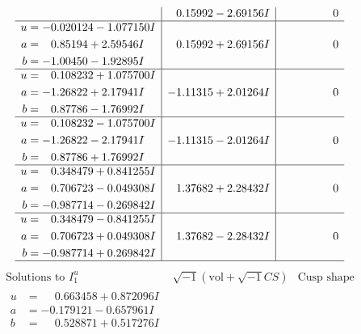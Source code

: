 \documentclass[1p]{elsarticle_modified}
\theoremstyle{definition}
\newcommand{\I}{\sqrt{-1}}
\begin{document}
$$\begin{array}{c|c|c}
 & \phantom{-}0.15992 - 2.69156 I & \phantom{-0.000000 } 0 \\ \hline\begin{aligned}
u &= -0.020124 - 1.077150 I \\
a &= \phantom{-}0.85194 + 2.59546 I \\
b &= -1.00450 - 1.92895 I\end{aligned}
 & \phantom{-}0.15992 + 2.69156 I & \phantom{-0.000000 } 0 \\ \hline\begin{aligned}
u &= \phantom{-}0.108232 + 1.075700 I \\
a &= -1.26822 + 2.17941 I \\
b &= \phantom{-}0.87786 - 1.76992 I\end{aligned}
 & -1.11315 + 2.01264 I & \phantom{-0.000000 } 0 \\ \hline\begin{aligned}
u &= \phantom{-}0.108232 - 1.075700 I \\
a &= -1.26822 - 2.17941 I \\
b &= \phantom{-}0.87786 + 1.76992 I\end{aligned}
 & -1.11315 - 2.01264 I & \phantom{-0.000000 } 0 \\ \hline\begin{aligned}
u &= \phantom{-}0.348479 + 0.841255 I \\
a &= \phantom{-}0.706723 - 0.049308 I \\
b &= -0.987714 - 0.269842 I\end{aligned}
 & \phantom{-}1.37682 + 2.28432 I & \phantom{-0.000000 } 0 \\ \hline\begin{aligned}
u &= \phantom{-}0.348479 - 0.841255 I \\
a &= \phantom{-}0.706723 + 0.049308 I \\
b &= -0.987714 + 0.269842 I\end{aligned}
 & \phantom{-}1.37682 - 2.28432 I & \phantom{-0.000000 } 0\\
 \hline 
 \end{array}$$\newpage$$\begin{array}{c|c|c}  
\text{Solutions to }I^u_{1}& \I (\text{vol} + \sqrt{-1}CS) & \text{Cusp shape}\\
 \hline 
\begin{aligned}
u &= \phantom{-}0.663458 + 0.872096 I \\
a &= -0.179121 - 0.657961 I \\
b &= \phantom{-}0.528871 + 0.517276 I\end{aligned}

\end{array}$$
\end{document}
